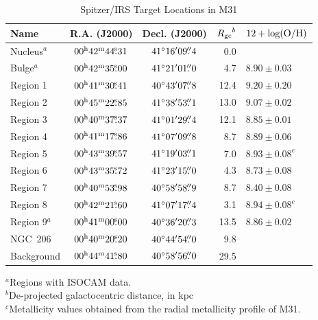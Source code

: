 \begin{table}
 \centering
 \begin{minipage}{90mm}
\caption{Spitzer/IRS Target Locations in M31
\label{regions}}
\begin{tabular}{lccrl}
\hline Name & R.A. (J2000) & Decl. (J2000) & ${R_{\rm gc}}^b$ & $12+\log({\rm O/H})$
\\
 \hline
Nucleus$^a$ & $00^{\rmn{h}}42^{\rmn{m}}44\fs31$ & $41\hbox{$^\circ$}16\hbox{$^\prime$}09\hbox{$.\!\!^{\prime\prime}$}4$  & 0.0 & \\
Bulge$^a$   & $00^{\rmn{h}}42^{\rmn{m}}35\fs00$ & $41\hbox{$^\circ$}21\hbox{$^\prime$}01\hbox{$.\!\!^{\prime\prime}$}0$  & 4.7 &$8.90\pm0.03$\\
Region 1    & $00^{\rmn{h}}41^{\rmn{m}}30\fs41$ & $40\hbox{$^\circ$}43\hbox{$^\prime$}07\hbox{$.\!\!^{\prime\prime}$}8$  & 12.4 &$9.20\pm0.20$\\
Region 2    & $00^{\rmn{h}}45^{\rmn{m}}22\fs85$ & $41\hbox{$^\circ$}38\hbox{$^\prime$}53\hbox{$.\!\!^{\prime\prime}$}1$  & 13.0 &$9.07\pm0.02$\\
Region 3    & $00^{\rmn{h}}40^{\rmn{m}}37\fs37$ & $41\hbox{$^\circ$}01\hbox{$^\prime$}29\hbox{$.\!\!^{\prime\prime}$}4$  & 12.1 &$8.85\pm0.01$\\
Region 4    & $00^{\rmn{h}}41^{\rmn{m}}17\fs86$ & $41\hbox{$^\circ$}07\hbox{$^\prime$}09\hbox{$.\!\!^{\prime\prime}$}8$  & 8.7 &$8.89\pm0.06$\\
Region 5    & $00^{\rmn{h}}43^{\rmn{m}}39\fs57$ & $41\hbox{$^\circ$}19\hbox{$^\prime$}03\hbox{$.\!\!^{\prime\prime}$}1$  & 7.0 &$8.93\pm0.08^c$\\
Region 6    & $00^{\rmn{h}}43^{\rmn{m}}35\fs72$ & $41\hbox{$^\circ$}23\hbox{$^\prime$}15\hbox{$.\!\!^{\prime\prime}$}0$  & 4.3 &$8.73\pm0.08$\\
Region 7    & $00^{\rmn{h}}40^{\rmn{m}}53\fs98$ & $40\hbox{$^\circ$}58\hbox{$^\prime$}58\hbox{$.\!\!^{\prime\prime}$}9$  & 8.7 &$8.40\pm0.08$\\
Region 8    & $00^{\rmn{h}}42^{\rmn{m}}21\fs60$ & $41\hbox{$^\circ$}07\hbox{$^\prime$}17\hbox{$.\!\!^{\prime\prime}$}4$  & 3.1 &$8.94\pm0.08^c$\\
Region 9$^a$& $00^{\rmn{h}}41^{\rmn{m}}00\fs00$ & $40\hbox{$^\circ$}36\hbox{$^\prime$}20\hbox{$.\!\!^{\prime\prime}$}3$  & 13.5 &$8.86\pm0.02$\\
NGC~206     & $00^{\rmn{h}}40^{\rmn{m}}20\fs20$ & $40\hbox{$^\circ$}44\hbox{$^\prime$}54\hbox{$.\!\!^{\prime\prime}$}0$  & 9.8 & \\
Background  & $00^{\rmn{h}}44^{\rmn{m}}41\fs80 $ & $40\hbox{$^\circ$}58\hbox{$^\prime$}56\hbox{$.\!\!^{\prime\prime}$}0$  & 29.5 & \\
\hline
\end{tabular}
{$^a$Regions with ISOCAM data.\\
$^b$De-projected galactocentric distance, in kpc\\ 
$^c$Metallicity values obtained from the radial metallicity profile of M31.}
\end{minipage}
\end{table}

